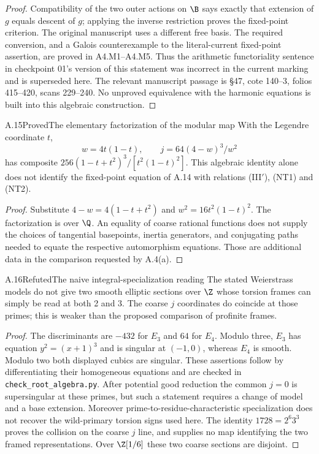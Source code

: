 \begin{proof}
Compatibility of the two outer actions on $\B$ says
exactly that extension of $g$ equals descent of $g$;
applying the inverse restriction proves the fixed-point
criterion. The original manuscript uses a different free basis.
The required conversion, and a Galois counterexample to the
literal-current fixed-point assertion, are proved in A4.M1--A4.M5.
Thus the arithmetic functoriality sentence in checkpoint 01's
version of this statement was incorrect in the current marking
and is superseded here. The relevant manuscript passage is
\S47, cote 140--3, folios 415--420, scans 229--240.
No unproved equivalence with the harmonic equations is built
into this algebraic construction.
\end{proof}

\begin{statement}{A.15}{Proved}{The elementary factorization of the modular map}
With the Legendre coordinate $t$,
\[
 w=4t(1-t),\qquad j=64(4-w)^3/w^2
\]
has composite $256(1-t+t^2)^3/[t^2(1-t)^2]$.
This algebraic identity alone does not identify the
fixed-point equation of A.14 with relations (III$'$),
(NT1) and (NT2).
\end{statement}
\begin{proof}
Substitute $4-w=4(1-t+t^2)$ and
$w^2=16t^2(1-t)^2$. The factorization is over $\Q$.
An equality of coarse rational functions does not supply
the choices of tangential basepoints, inertia generators,
and conjugating paths needed to equate the respective
automorphism equations. Those are additional data in
the comparison requested by A.4(a).
\end{proof}

\begin{statement}{A.16}{Refuted}{The naive integral-specialization reading}
The stated Weierstrass models do not give two smooth
elliptic sections over $\Z$ whose torsion frames can simply
be read at both 2 and 3. The coarse $j$ coordinates do
coincide at those primes; this is weaker than the proposed
comparison of profinite frames.
\end{statement}
\begin{proof}
The discriminants are $-432$ for $E_3$ and $64$ for $E_4$.
Modulo three, $E_3$ has equation $y^2=(x+1)^3$ and is
singular at $(-1,0)$, whereas $E_4$ is smooth. Modulo
two both displayed cubics are singular. These assertions
follow by differentiating their homogeneous equations
and are checked in \texttt{check\_root\_algebra.py}.
After potential good reduction the common $j=0$ is
supersingular at these primes, but such a statement
requires a change of model and a base extension.
Moreover prime-to-residue-characteristic specialization
does not recover the wild-primary torsion signs used here.
The identity $1728=2^6 3^3$ proves the collision on the
coarse $j$ line, and supplies no map identifying the
two framed representations. Over $\Z[1/6]$ these two
coarse sections are disjoint.
\end{proof}
